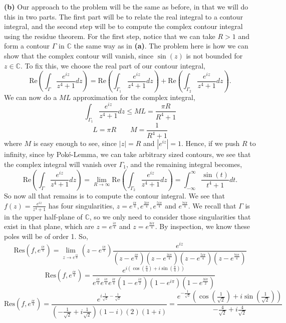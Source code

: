 \documentclass[10pt]{article}
\newcommand{\C}{\mathbb{C}}
\begin{document}
\textbf{(b)}
Our approach to the problem will be the same as before, in that we will do this in two parts. The first part will be to relate the real integral to a contour integral, and the second step will be to compute the complex contour integral using the residue theorem. For the first step, notice that we can take $R>1$ and form a contour $\Gamma$ in $\C$ the same way as in \textbf{(a)}. The problem here is how we can show that the complex contour will vanish, since $\sin(z)$ is not bounded for $z\in\C$. To fix this, we choose the real part of our contour integral,
$$\text{Re}\left(\int_{\Gamma}\frac{e^{iz}}{z^{4} + 1}dz\right) = \text{Re}\left(\int_{\Gamma_{1}}\frac{e^{iz}}{z^{4} + 1}dz\right) + \text{Re}\left(\int_{\Gamma_{2}}\frac{e^{iz}}{z^{4} + 1}dz\right).$$
We can now do a $ML$ approximation for the complex integral,
$$\int_{\Gamma_{1}}\frac{e^{iz}}{z^{4} + 1}dz \leq ML = \frac{\pi R}{R^{4} +1}$$
$$L = \pi R \hspace{2em} M = \frac{1}{R^{4} + 1}$$
where $M$ is easy enough to see, since $|z| = R$ and $|e^{iz}| = 1$. Hence, if we push $R$ to infinity, since by Pok\'e-Lemma, we can take arbitrary sized contours, we see that the complex integral will vanish over $\Gamma_{1}$, and the remaining integral becomes,
$$\text{Re}\left(\int_{\Gamma}\frac{e^{iz}}{z^{4} + 1}dz\right) = \lim_{R \to \infty}\text{Re}\left(\int_{\Gamma_{2}}\frac{e^{iz}}{z^{4} + 1}dz\right) = \int_{-\infty}^{\infty}\frac{\sin(t)}{t^{4} + 1}dt. $$
So now all that remains is to compute the contour integral. We see that $f(z) = \frac{e^{iz}}{z^{4} + 1}$ has four singularities, $z = e^{\frac{i\pi}{4}}, e^{\frac{3i\pi}{4}}, e^{\frac{5i\pi}{4}}$ and $e^{\frac{7i\pi}{4}}$. We recall that $\Gamma$ is in the upper half-plane of $\C$, so we only need to consider those singularities that exist in that plane, which are $z = e^{\frac{i\pi}{4}}$ and $z = e^{\frac{3i\pi}{4}}$. By inspection, we know these poles will be of order 1. So,
$$\text{Res}(f,e^{\frac{i\pi}{4}}) = \lim_{z\to e^{\frac{i\pi}{4}}}\left(z-e^{\frac{i\pi}{4}}\right)\frac{e^{iz}}{\left(z - e^{\frac{i\pi}{4}}\right)\left(z - e^{\frac{3i\pi}{4}}\right)\left(z-e^{\frac{5i\pi}{4}}\right)\left(z-e^{\frac{7i\pi}{4}}\right)}$$
$$\text{Res}(f,e^{\frac{i\pi}{4}}) = \frac{e^{i(\cos(\frac{\pi}{4}) + i\sin(\frac{\pi}{4}))}}{e^\frac{i\pi}{4}e^\frac{i\pi}{4}e^\frac{i\pi}{4}\left(1 - e^{\frac{i\pi}{2}}\right)\left(1 - e^{i\pi}\right)\left(1 - e^{\frac{3i\pi}{2}}\right)}$$
$$\text{Res}(f,e^\frac{i\pi}{4}) = \frac{e^{i\frac{1}{\sqrt{2}} - \frac{1}{\sqrt{2}}}}{\left(-\frac{1}{\sqrt{2}} + i\frac{1}{\sqrt{2}}\right)(1 - i)(2)(1+i)} = \frac{e^{-\frac{1}{\sqrt{2}}}\left(\cos\left(\frac{1}{\sqrt{2}}\right) + i\sin\left(\frac{1}{\sqrt{2}}\right)\right)}{-\frac{4}{\sqrt{2}} + i\frac{4}{\sqrt{2}}}$$
\end{document}
